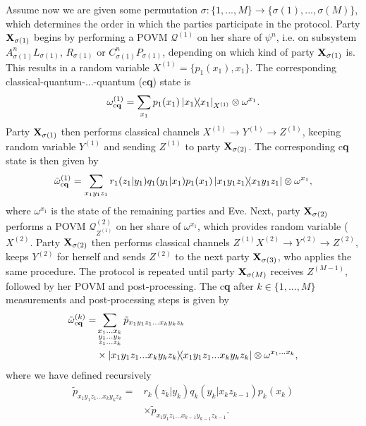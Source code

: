 \documentclass[aps,pra,twocolumn,superscriptaddress,longbibliography]{revtex4-1}
\newcommand{\mc}[1]{\mathcal{#1}}
\begin{document}
Assume now we are given some permutation $\sigma:\{1,...,M\}\to\{\sigma(1),...,\sigma(M)\}$, which determines the order in which the parties participate in the protocol. Party ${\bf X}_{\sigma(1)}$ begins by performing a POVM $\mc{Q}^{(1)}$ on her share of $\psi^n$, i.e. on subsystem $A^n_{\sigma(1)}L_{\sigma(1)}$, $R_{\sigma(1)}$ or $C^n_{\sigma(1)}P_{\sigma(1)}$, depending on which kind of party ${\bf X}_{\sigma(1)}$ is. This results in a random variable $X^{(1)}=\{p_1(x_1),x_1\}$. The corresponding classical-quantum-...-quantum (c{\bf q}) state is
\begin{equation}
\omega^{(1)}_{c{\bf q}}=\sum_{x_1}p_1(x_1)\op{x_1}_{X^{(1)}}\otimes\omega^{x_1}.
\end{equation}
Party ${\bf X}_{\sigma(1)}$ then performs classical channels $X^{(1)}\to Y^{(1)}\to Z^{(1)}$, keeping random variable $Y^{(1)}$ and sending $Z^{(1)}$ to party ${\bf X}_{\sigma(2)}$. The corresponding c{\bf q} state is then given by 
\begin{equation}\label{eq:cq1}
\tilde{\omega}^{(1)}_{c{\bf q}}=\sum_{x_1y_1z_1}r_1(z_1|y_1)q_1(y_1|x_1)p_1(x_1)\op{x_1y_1z_1}\otimes\omega^{x_1},
\end{equation}
where $\omega^{x_1}$ is the state of the remaining parties and Eve. Next, party ${\bf X}_{\sigma(2)}$ performs a POVM $\mc{Q}_{Z^{(1)}}^{(2)}$ on her share of $\omega^{x_{1}}$, which provides random variable ($X^{(2)}$. Party ${\bf X}_{\sigma(2)}$ then performs classical channels $Z^{(1)}X^{(2)}\to Y^{(2)}\to Z^{(2)}$, keeps $Y^{(2)}$ for herself and sends $Z^{(2)}$ to the next party ${\bf X}_{\sigma(3)}$, who applies the same procedure. The protocol is repeated until party ${\bf X}_{\sigma(M)}$ receives $Z^{(M-1)}$, followed by her POVM and post-processing. The c{\bf q} after $k\in\{1,...,M\}$ measurements and post-processing steps is given by
\begin{align}\label{eq:cqk}
\tilde{\omega}^{(k)}_{c{\bf q}}=&\sum_{\substack{x_1...x_k\\y_1...y_k\\z_1...z_k}}\tilde{p}_{x_1y_1z_1...x_ky_kz_k}\\
&\times\op{x_1y_1z_1...x_ky_kz_k}\otimes\omega^{x_1...x_k},\nonumber
\end{align}
where we have defined recursively
\begin{align}
\tilde{p}_{x_1y_1z_1...x_ky_kz_k}=&r_k(z_k|y_k)q_k(y_k|x_kz_{k-1})p_k(x_k)\\
&\times\tilde{p}_{x_1y_1z_1...x_{k-1}y_{k-1}z_{k-1}}.\nonumber
\end{align}
\end{document}
